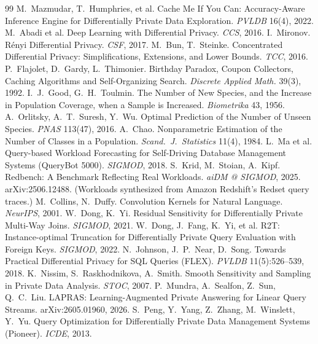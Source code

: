 \documentclass[sigconf,nonacm]{acmart}
\begin{document}
\begin{thebibliography}{99}
 M.\ Mazmudar, T.\ Humphries, et al. Cache Me If You Can: Accuracy-Aware Inference Engine for Differentially Private Data Exploration. \emph{PVLDB} 16(4), 2022.
 M.\ Abadi et al. Deep Learning with Differential Privacy. \emph{CCS}, 2016.
 I.\ Mironov. R\'enyi Differential Privacy. \emph{CSF}, 2017.
 M.\ Bun, T.\ Steinke. Concentrated Differential Privacy: Simplifications, Extensions, and Lower Bounds. \emph{TCC}, 2016.
 P.\ Flajolet, D.\ Gardy, L.\ Thimonier. Birthday Paradox, Coupon Collectors, Caching Algorithms and Self-Organizing Search. \emph{Discrete Applied Math.} 39(3), 1992.
 I.\ J.\ Good, G.\ H.\ Toulmin. The Number of New Species, and the Increase in Population Coverage, when a Sample is Increased. \emph{Biometrika} 43, 1956.
 A.\ Orlitsky, A.\ T.\ Suresh, Y.\ Wu. Optimal Prediction of the Number of Unseen Species. \emph{PNAS} 113(47), 2016.
 A.\ Chao. Nonparametric Estimation of the Number of Classes in a Population. \emph{Scand.\ J.\ Statistics} 11(4), 1984.
 L.\ Ma et al. Query-based Workload Forecasting for Self-Driving Database Management Systems (QueryBot 5000). \emph{SIGMOD}, 2018.
 S.\ Krid, M.\ Stoian, A.\ Kipf. Redbench: A Benchmark Reflecting Real Workloads. \emph{aiDM @ SIGMOD}, 2025. arXiv:2506.12488. (Workloads synthesized from Amazon Redshift's Redset query traces.)
 M.\ Collins, N.\ Duffy. Convolution Kernels for Natural Language. \emph{NeurIPS}, 2001.
 W.\ Dong, K.\ Yi. Residual Sensitivity for Differentially Private Multi-Way Joins. \emph{SIGMOD}, 2021.
 W.\ Dong, J.\ Fang, K.\ Yi, et al. R2T: Instance-optimal Truncation for Differentially Private Query Evaluation with Foreign Keys. \emph{SIGMOD}, 2022.
 N.\ Johnson, J.\ P.\ Near, D.\ Song. Towards Practical Differential Privacy for SQL Queries (FLEX). \emph{PVLDB} 11(5):526--539, 2018.
 K.\ Nissim, S.\ Raskhodnikova, A.\ Smith. Smooth Sensitivity and Sampling in Private Data Analysis. \emph{STOC}, 2007.
 P.\ Mundra, A.\ Sealfon, Z.\ Sun, Q.\ C.\ Liu. LAPRAS: Learning-Augmented Private Answering for Linear Query Streams. arXiv:2605.01960, 2026.
 S.\ Peng, Y.\ Yang, Z.\ Zhang, M.\ Winslett, Y.\ Yu. Query Optimization for Differentially Private Data Management Systems (Pioneer). \emph{ICDE}, 2013.

\end{thebibliography}
\end{document}
